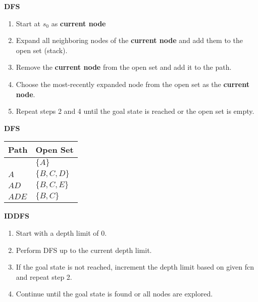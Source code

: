 \begin{process} \textbf{DFS}
    \begin{enumerate}
        \item Start at $s_0$ as \textbf{current node}
        \item Expand all neighboring nodes of the \textbf{current node} and add them to the open set (stack).
        \item Remove the \textbf{current node} from the open set and add it to the path. 
        \item Choose the most-recently expanded node from the open set as the \textbf{current node}.
        \item Repeat steps 2 and 4 until the goal state is reached or the open set is empty.
    \end{enumerate}
\end{process}

\begin{example} \textbf{DFS}
    \begin{center}
        \begin{tabular}{ll}
        \toprule
        \textbf{Path} & \textbf{Open Set} \\
        \midrule
         & $\{A\}$ \\
        $A$ & $\{B,C,D\}$ \\
        $AD$ & $\{B,C,E\}$ \\
        $ADE$ & $\{B, C\}$ \\
        \bottomrule
        \end{tabular}
    \end{center}
\end{example}
\newpage

\begin{process} \textbf{IDDFS}
    \begin{enumerate}
        \item Start with a depth limit of 0.
        \item Perform DFS up to the current depth limit.
        \item If the goal state is not reached, increment the depth limit based on given fcn and repeat step 2.
        \item Continue until the goal state is found or all nodes are explored.
    \end{enumerate}
\end{process}

